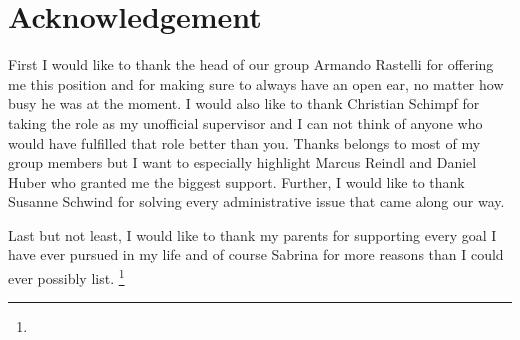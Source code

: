 \chapter*{Acknowledgement}
\label{cha:acknowledgment}

First I would like to thank the head of our group Armando Rastelli for offering me this position and for making sure to always have an open ear, no matter how busy he was at the moment.
I would also like to thank Christian Schimpf for taking the role as my unofficial supervisor and I can not think of anyone who would have fulfilled that role better than you.
Thanks belongs to most of my group members but I want to especially highlight Marcus Reindl and Daniel Huber who granted me the biggest support. 
Further, I would like to thank Susanne Schwind for solving every administrative issue that came along our way.

Last but not least, I would like to thank my parents for supporting every goal I have ever pursued in my life and of course Sabrina for more reasons than I could ever possibly list.
\footnote{\mycolophon}
